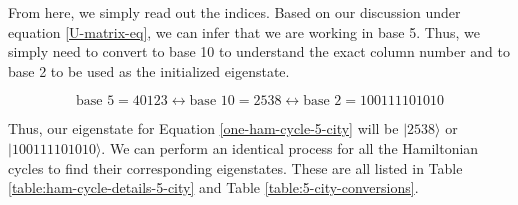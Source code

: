 \documentclass[msc,oneside]{ubcthesis}
\begin{document}
	From here, we simply read out the indices. Based on our discussion under equation \ref{U-matrix-eq}, we can infer that we are working in base 5. Thus, we simply need to convert to base 10 to understand the exact column number and to base 2 to be used as the initialized eigenstate.
	
	\begin{equation*}
		\text{base } 5 = 40123 \leftrightarrow \text{base } 10 = 2538 \leftrightarrow  \text{base } 2 = 100111101010
	\end{equation*}
	
	Thus, our eigenstate for Equation \ref{one-ham-cycle-5-city} will be $|2538\rangle$ or $|100111101010\rangle$. We can perform an identical process for all the Hamiltonian cycles to find their corresponding eigenstates. These are all listed in Table \ref{table:ham-cycle-details-5-city} and Table \ref{table:5-city-conversions}.
	
	
	
\end{document}
